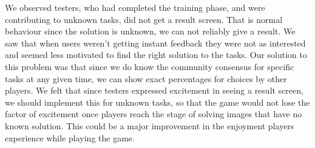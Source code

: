 We observed testers, who had completed the training phase, and were contributing to unknown tasks, did not get a result screen. That is normal behaviour since the solution is unknown, we can not reliably give a result. We saw that when users weren't getting instant feedback they were not as interested and seemed less motivated to find the right solution to the tasks. Our solution to this problem was that since we do know the community consensus for specific tasks at any given time, we can show exact percentages for choices by other players. We felt that since testers expressed excitement in seeing a result screen, we should implement this for unknown tasks, so that the game would not lose the factor of excitement once players reach the stage of solving images that have no known solution. This could be a major improvement in the enjoyment players experience while playing the game.